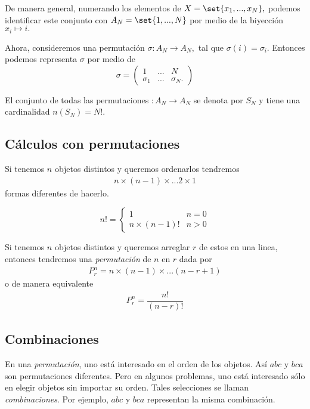 De manera general, numerando los elementos de $X=\set{x_{1},...,x_{N}},$ podemos identificar este conjunto con $A_{N}=\set{1,...,N}$ por medio de la biyección $x_{i} \mapsto i.$


Ahora, consideremos una permutación $\sigma:A_{N}\to A_{N},$ tal que $\sigma(i)=\sigma_{i}.$ Entonces podemos representa $\sigma$ por medio de 
$$\sigma=
\begin{pmatrix}
	1& ... & N \\
	\sigma_{1}& ... & \sigma_{N}.
\end{pmatrix}
$$


El conjunto de todas las permutaciones $:A_{N}\to A_{N}$ se denota por $S_{N}$ y tiene una cardinalidad 
$n(S_{N})=N!.$

\subsection{Cálculos con permutaciones}
Si tenemos $n$ objetos distintos y queremos ordenarlos tendremos
\begin{align*}
	n \times (n-1) \times ... 2\times 1
\end{align*} formas diferentes de hacerlo.

{}
\begin{definicion}[$n$ factorial]
	\[
		n! = \begin{cases}
			1 & n=0 \\
			n\times(n-1)! & n>0
		\end{cases}
	\]
	
\end{definicion}


Si tenemos $n$ objetos distintos y queremos arreglar $r$ de estos en una linea, entonces tendremos una \emph{permutación} de $n$ en $r$ dada por
\begin{align}
	\label{1.25}
	P^{n}_{r}=n\times(n-1)\times...\left( n-r+1 \right)
\end{align} 
o de manera equivalente
\begin{align}
	\label{1.27}
	P^{n}_{r}=\dfrac{n!}{(n-r)!}
\end{align}



\subsection{Combinaciones}
{}
En una \emph{permutación}, uno está interesado en el orden de los objetos. Así $abc$ y $bca$ son permutaciones diferentes.  Pero en algunos problemas, uno está interesado sólo en elegir objetos sin importar su orden.  Tales selecciones se llaman \emph{combinaciones}.  Por ejemplo, $abc$ y $bca$ representan la misma combinación.



